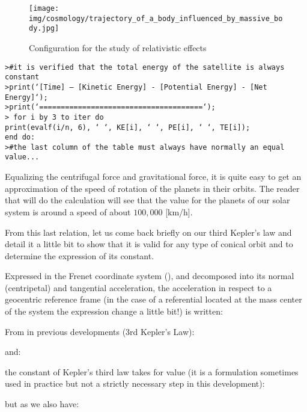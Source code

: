 	\begin{figure}[H]
		\begin{center}
		\texttt{[image: img/cosmology/trajectory\_of\_a\_body\_influenced\_by\_massive\_body.jpg]}
		\end{center}	
		\caption{Configuration for the study of relativistic effects}
	\end{figure}

	\texttt{>\#it is verified that the total energy of the satellite is always constant\\
	>print(`[Time] -- [Kinetic Energy] - [Potential Energy] - [Net Energy]`);\\
	>print(`======================================`);\\
	> for i by 3 to iter do\\
	print(evalf(i/n, 6), ` `, KE[i], ` `, PE[i], ` `, TE[i]);\\
	end do:\\
	>\#the last column of the table must always have normally an equal value...}
	
	\begin{tcolorbox}[title=Remark,colframe=black,arc=10pt]
	Equalizing the centrifugal force and gravitational force, it is quite easy to get an approximation of the speed of rotation of the planets in their orbits. The reader that will do the calculation will see that the value for the planets of our solar system is around a speed of about $100,000$ [km/h].
	\end{tcolorbox}	
	
	From this last relation, let us come back briefly on our third Kepler's law and detail it a little bit to show that it is valid for any type of conical orbit and to determine the expression of its constant.
	
	Expressed in the Frenet coordinate system (), and decomposed into its normal (centripetal) and tangential acceleration, the acceleration in respect to a geocentric reference frame (in the case of a referential located at the mass center of the system the expression change a little bit!) is written:
	
	From in previous developments (3rd Kepler's Law):
	
	and:
	
	the constant of Kepler's third law takes for value (it is a formulation sometimes used in practice but not a strictly necessary step in this development):
	
	but as we also have:
	
